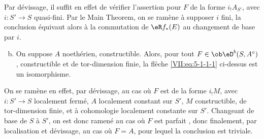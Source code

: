 Par dévissage, il suffit en effet de vérifier l'assertion pour $F$ de la 
forme $i_! A_{S'}$, avec $i:S'\to S$ quasi-fini. Par le Main Theorem, on se 
ramène à supposer $i$ fini, la conclusion équivaut alors à la 
commutation de $\eR f_\ast(E)$ au changement de base par $i$. 
\begin{enumerate}[a)]
\setcounter{enumi}{1}
  \item On suppose $A$ noethérien, constructible. Alors, pour tout 
    $F\in\ob\eD^b(S,A^\circ)$, constructible et de tor-dimension finie, la 
    flèche \eqref{VII:eq:5-1-1-1} ci-dessus est un isomorphisme. 
\end{enumerate}

On se ramène en effet, par dévissage, au cas où $F$ est de la forme 
$i_! M$, avec $i:S'\to S$ localement fermé, $A$ localement constant sur $S'$, 
$M$ constructible, de tor-dimension finie, et à cohomologie localement 
constante sur $S'$. Changeant de base de $S$ à $S'$, on est donc ramené au 
cas où $F$ est parfait , donc finalement, par localisation et 
dévissage, au cas où $F=A$, pour lequel la conclusion est triviale. 





\subsubsection{}\label{VII:5-1-3}

